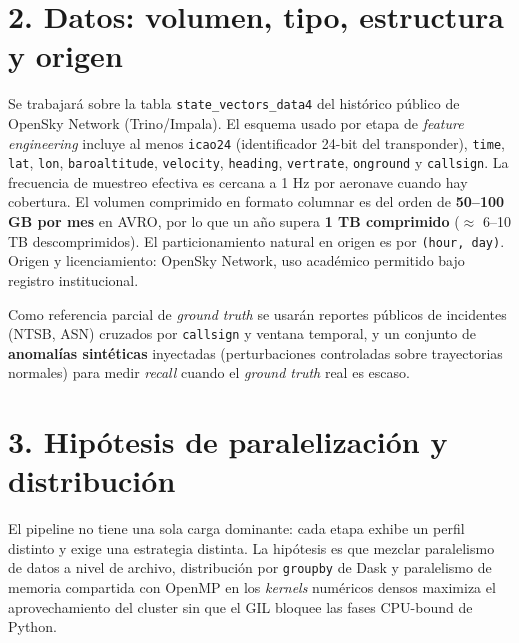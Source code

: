 \documentclass[letterpaper,11pt]{article}
\begin{document}
\section*{2. Datos: volumen, tipo, estructura y origen}

Se trabajará sobre la tabla \texttt{state\_vectors\_data4} del histórico público de OpenSky Network (Trino/Impala). El esquema usado por etapa de \textit{feature engineering} incluye al menos \texttt{icao24} (identificador 24-bit del transponder), \texttt{time}, \texttt{lat}, \texttt{lon}, \texttt{baroaltitude}, \texttt{velocity}, \texttt{heading}, \texttt{vertrate}, \texttt{onground} y \texttt{callsign}. La frecuencia de muestreo efectiva es cercana a 1 Hz por aeronave cuando hay cobertura. El volumen comprimido en formato columnar es del orden de \textbf{50--100 GB por mes} en AVRO, por lo que un año supera \textbf{1 TB comprimido} ($\approx$ 6--10 TB descomprimidos). El particionamiento natural en origen es por \texttt{(hour, day)}. Origen y licenciamiento: OpenSky Network, uso académico permitido bajo registro institucional.

Como referencia parcial de \textit{ground truth} se usarán reportes públicos de incidentes (NTSB, ASN) cruzados por \texttt{callsign} y ventana temporal, y un conjunto de \textbf{anomalías sintéticas} inyectadas (perturbaciones controladas sobre trayectorias normales) para medir \textit{recall} cuando el \textit{ground truth} real es escaso.

\section*{3. Hipótesis de paralelización y distribución}

El pipeline no tiene una sola carga dominante: cada etapa exhibe un perfil distinto y exige una estrategia distinta. La hipótesis es que mezclar paralelismo de datos a nivel de archivo, distribución por \texttt{groupby} de Dask y paralelismo de memoria compartida con OpenMP en los \textit{kernels} numéricos densos maximiza el aprovechamiento del cluster sin que el GIL bloquee las fases CPU-bound de Python.
\end{document}

